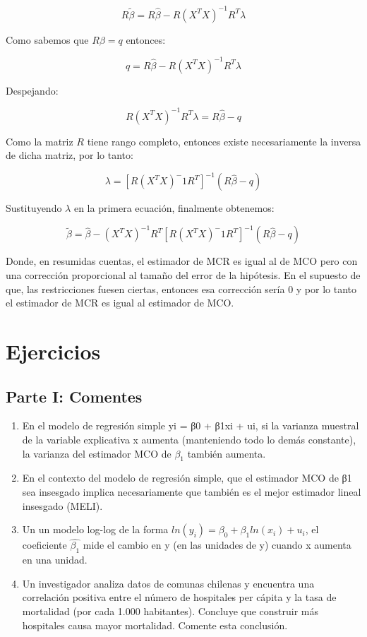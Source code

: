 \documentclass[
]{book}
\begin{document}
\[
R\widetilde{\beta} = R\hat{\beta} - R(X^TX)^{-1}R^T\lambda
\]

Como sabemos que \(R\beta = q\) entonces:

\[
q = R\hat{\beta} - R(X^TX)^{-1}R^T\lambda
\]

Despejando:

\[
R(X^TX)^{-1}R^T\lambda = R\hat{\beta} - q 
\]

Como la matriz \(R\) tiene rango completo, entonces existe necesariamente la inversa de dicha matriz, por lo tanto:

\[
\lambda = [R(X^TX)^-1R^T]^{-1}(R\hat{\beta}-q)
\]

Sustituyendo \(\lambda\) en la primera ecuación, finalmente obtenemos:

\[
\widetilde{\beta} = \hat{\beta} - (X^TX)^{-1}R^T[R(X^TX)^-1R^T]^{-1}(R\hat{\beta}-q)
\]

Donde, en resumidas cuentas, el estimador de MCR es igual al de MCO pero con una corrección proporcional al tamaño del error de la hipótesis. En el supuesto de que, las restricciones fuesen ciertas, entonces esa corrección sería 0 y por lo tanto el estimador de MCR es igual al estimador de MCO.

\chapter{Ejercicios}\label{ejercicios}

\section{Parte I: Comentes}\label{parte-i-comentes}

\begin{enumerate}
\def\labelenumi{\arabic{enumi}.}
\item
  En el modelo de regresión simple yi = β0 + β1xi + ui, si la varianza muestral de
  la variable explicativa x aumenta (manteniendo todo lo demás constante), la varianza del
  estimador MCO de \(\beta_1\) también aumenta.
\item
  En el contexto del modelo de regresión simple, que el estimador MCO de β1
  sea insesgado implica necesariamente que también es el mejor estimador lineal insesgado
  (MELI).
\item
  Un un modelo log-log de la forma \(ln(y_i) = \beta_0 + \beta_1ln(x_i) + u_i\), el coeficiente \(\hat{\beta_1}\)
  mide el cambio en y (en las unidades de y) cuando x aumenta en una unidad.
\item
  Un investigador analiza datos de comunas chilenas y encuentra una correlación
  positiva entre el número de hospitales per cápita y la tasa de mortalidad (por cada 1.000
  habitantes). Concluye que construir más hospitales causa mayor mortalidad. Comente
  esta conclusión.
\end{enumerate}
\end{document}
